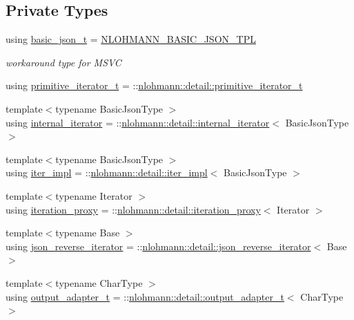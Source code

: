 \subsection*{Private Types}
\begin{DoxyCompactItemize}
\item 
using \hyperlink{classnlohmann_1_1basic__json_a125c0afa5f3599949b0589ef7b4aa322}{basic\+\_\+json\+\_\+t} = \hyperlink{json_8hpp_a80b7254e63f199a1f656f07ae551f632}{N\+L\+O\+H\+M\+A\+N\+N\+\_\+\+B\+A\+S\+I\+C\+\_\+\+J\+S\+O\+N\+\_\+\+T\+PL}
\begin{DoxyCompactList}\small\item\em workaround type for M\+S\+VC \end{DoxyCompactList}\item 
using \hyperlink{classnlohmann_1_1basic__json_ae2cb9166f46abfc6d3910e076410f1ca}{primitive\+\_\+iterator\+\_\+t} = \+::\hyperlink{classnlohmann_1_1detail_1_1primitive__iterator__t}{nlohmann\+::detail\+::primitive\+\_\+iterator\+\_\+t}
\item 
{\footnotesize template$<$typename Basic\+Json\+Type $>$ }\\using \hyperlink{classnlohmann_1_1basic__json_abe6f1016de5097691cbfdbb989267718}{internal\+\_\+iterator} = \+::\hyperlink{structnlohmann_1_1detail_1_1internal__iterator}{nlohmann\+::detail\+::internal\+\_\+iterator}$<$ Basic\+Json\+Type $>$
\item 
{\footnotesize template$<$typename Basic\+Json\+Type $>$ }\\using \hyperlink{classnlohmann_1_1basic__json_a7b03055088a8e9770680ee975fb8ba55}{iter\+\_\+impl} = \+::\hyperlink{classnlohmann_1_1detail_1_1iter__impl}{nlohmann\+::detail\+::iter\+\_\+impl}$<$ Basic\+Json\+Type $>$
\item 
{\footnotesize template$<$typename Iterator $>$ }\\using \hyperlink{classnlohmann_1_1basic__json_ae2ce7eec3ae7e7b903e0344e89f0512b}{iteration\+\_\+proxy} = \+::\hyperlink{classnlohmann_1_1detail_1_1iteration__proxy}{nlohmann\+::detail\+::iteration\+\_\+proxy}$<$ Iterator $>$
\item 
{\footnotesize template$<$typename Base $>$ }\\using \hyperlink{classnlohmann_1_1basic__json_a556d91bc2228135b27eb189e5a90ea4c}{json\+\_\+reverse\+\_\+iterator} = \+::\hyperlink{classnlohmann_1_1detail_1_1json__reverse__iterator}{nlohmann\+::detail\+::json\+\_\+reverse\+\_\+iterator}$<$ Base $>$
\item 
{\footnotesize template$<$typename Char\+Type $>$ }\\using \hyperlink{classnlohmann_1_1basic__json_ac4927a4f303011cd45b99f2a7c18c866}{output\+\_\+adapter\+\_\+t} = \+::\hyperlink{namespacenlohmann_1_1detail_a0fd8edff7729aa2dd92b070964bade2e}{nlohmann\+::detail\+::output\+\_\+adapter\+\_\+t}$<$ Char\+Type $>$

\end{DoxyCompactItemize}
